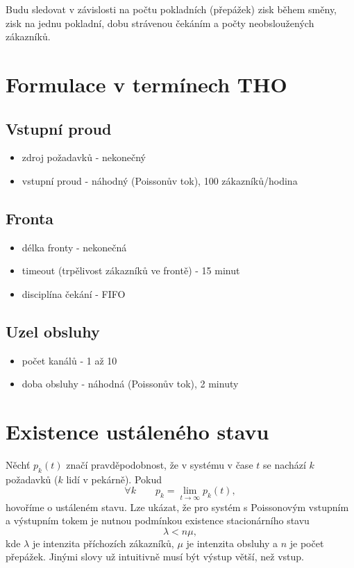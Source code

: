 \documentclass[a4paper,12pt]{article}
\begin{document}
Budu sledovat v závislosti na počtu pokladních (přepážek) zisk během směny, zisk na jednu pokladní, 
dobu strávenou čekáním a počty neobsloužených zákazníků. 

\section{Formulace v termínech THO}
\subsection{Vstupní proud}
\begin{itemize}
	\item zdroj požadavků - nekonečný
	\item vstupní proud - náhodný (Poissonův tok), 100 zákazníků/hodina
\end{itemize}

\subsection{Fronta}
\begin{itemize}
	\item délka fronty - nekonečná
	\item timeout (trpělivost zákazníků ve frontě) - 15 minut
	\item disciplína čekání - FIFO
\end{itemize}
\subsection{Uzel obsluhy}
\begin{itemize}
	\item počet kanálů - 1 až 10
	\item doba obsluhy - náhodná (Poissonův tok), 2 minuty
\end{itemize}

\section{Existence ustáleného stavu}
Něchť \(p_k(t)\) značí pravděpodobnost, že v systému v čase \(t\) se nachází \(k\) požadavků (\(k\) lidí v pekárně). 
Pokud 
\[\forall k \qquad p_k = \lim_{t\to\infty} p_k(t),\]
hovoříme o ustáleném stavu. Lze ukázat, že pro systém s Poissonovým vstupním a výstupním tokem je nutnou 
podmínkou existence stacionárního stavu 
\[\lambda < n\mu,\]
kde \(\lambda\) je intenzita příchozích zákazníků, \(\mu\) je intenzita obsluhy a \(n\) je počet přepážek. 
Jinými slovy už intuitivně musí být výstup větší, než vstup.
\end{document}
